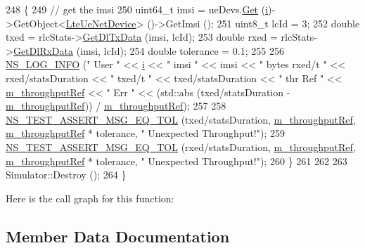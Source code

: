 \begin{DoxyCode}
248     \{
249       \textcolor{comment}{// get the imsi}
250       uint64\_t imsi = ueDevs.\hyperlink{classns3_1_1NetDeviceContainer_a677d62594b5c9d2dea155cc5045f4d0b}{Get} (\hyperlink{bernuolliDistribution_8m_a6f6ccfcf58b31cb6412107d9d5281426}{i})->GetObject<\hyperlink{classns3_1_1LteUeNetDevice}{LteUeNetDevice}> ()->GetImsi ();
251       uint8\_t lcId = 3;
252       \textcolor{keywordtype}{double} txed = rlcStats->\hyperlink{classns3_1_1RadioBearerStatsCalculator_a12f2d1946eb125e42611ecdc31079150}{GetDlTxData} (imsi, lcId);
253       \textcolor{keywordtype}{double} rxed = rlcStats->\hyperlink{classns3_1_1RadioBearerStatsCalculator_a80ec1463cd053d8deebda8498d2b864e}{GetDlRxData} (imsi, lcId);
254       \textcolor{keywordtype}{double} tolerance = 0.1;
255 
256       \hyperlink{group__logging_gafbd73ee2cf9f26b319f49086d8e860fb}{NS\_LOG\_INFO} (\textcolor{stringliteral}{" User "} << \hyperlink{bernuolliDistribution_8m_a6f6ccfcf58b31cb6412107d9d5281426}{i} << \textcolor{stringliteral}{" imsi "} << imsi << \textcolor{stringliteral}{" bytes rxed/t "} << rxed/statsDuration 
      << \textcolor{stringliteral}{" txed/t "} << txed/statsDuration << \textcolor{stringliteral}{" thr Ref "} << \hyperlink{classLenaHarqTestCase_a041c5b33791e34cdfa46c79235f6ac77}{m\_throughputRef} << \textcolor{stringliteral}{" Err "} << (std::abs
       (txed/statsDuration - \hyperlink{classLenaHarqTestCase_a041c5b33791e34cdfa46c79235f6ac77}{m\_throughputRef})) / \hyperlink{classLenaHarqTestCase_a041c5b33791e34cdfa46c79235f6ac77}{m\_throughputRef});
257 
258       \hyperlink{group__testing_ga9e7861b56b4e70db3b56044cb7a28e41}{NS\_TEST\_ASSERT\_MSG\_EQ\_TOL} (txed/statsDuration, 
      \hyperlink{classLenaHarqTestCase_a041c5b33791e34cdfa46c79235f6ac77}{m\_throughputRef}, \hyperlink{classLenaHarqTestCase_a041c5b33791e34cdfa46c79235f6ac77}{m\_throughputRef} * tolerance, \textcolor{stringliteral}{" Unexpected Throughput!"});
259       \hyperlink{group__testing_ga9e7861b56b4e70db3b56044cb7a28e41}{NS\_TEST\_ASSERT\_MSG\_EQ\_TOL} (rxed/statsDuration, 
      \hyperlink{classLenaHarqTestCase_a041c5b33791e34cdfa46c79235f6ac77}{m\_throughputRef}, \hyperlink{classLenaHarqTestCase_a041c5b33791e34cdfa46c79235f6ac77}{m\_throughputRef} * tolerance, \textcolor{stringliteral}{" Unexpected Throughput!"});
260     \}
261 
262 
263   Simulator::Destroy ();
264 \}
\end{DoxyCode}


Here is the call graph for this function\+:




\subsection{Member Data Documentation}
